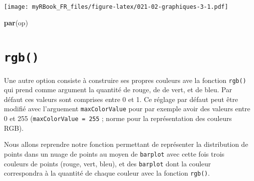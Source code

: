 \documentclass[]{book}
\newenvironment{Shaded}{\begin{snugshade}}{\end{snugshade}}
\newcommand{\KeywordTok}[1]{\textcolor[rgb]{0.13,0.29,0.53}{\textbf{#1}}}
\newcommand{\NormalTok}[1]{#1}
\begin{document}
\texttt{[image: myRBook\_FR\_files/figure-latex/021-02-graphiques-3-1.pdf]}

\begin{Shaded}
\begin{Highlighting}[]
\KeywordTok{par}\NormalTok{(op)}
\end{Highlighting}
\end{Shaded}

\hypertarget{rgb}{%
\section{\texorpdfstring{\texttt{rgb()}}{rgb()}}\label{rgb}}

Une autre option consiste à construire ses propres couleurs ave la fonction \texttt{rgb()} qui prend comme argument la quantité de rouge, de de vert, et de bleu. Par défaut ces valeurs sont comprises entre 0 et 1. Ce réglage par défaut peut être modifié avec l'arguement \texttt{maxColorValue} pour par exemple avoir des valeurs entre 0 et 255 (\texttt{maxColorValue\ =\ 255} ; norme pour la représentation des couleurs RGB).

Nous allons reprendre notre fonction permettant de représenter la distribution de points dans un nuage de points au moyen de \texttt{barplot} avec cette fois trois couleurs de points (rouge, vert, bleu), et des \texttt{barplot} dont la couleur correspondra à la quantité de chaque couleur avec la fonction \texttt{rgb()}.
\end{document}
